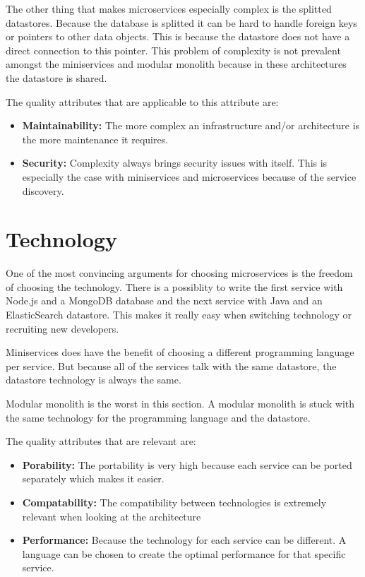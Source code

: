 The other thing that makes microservices especially complex is the splitted datastores. Because the database is splitted it can be hard to handle foreign keys or pointers to other data objects. This is because the datastore does not have a direct connection to this pointer. This problem of complexity is not prevalent amongst the miniservices and modular monolith because in these architectures the datastore is shared.

The quality attributes that are applicable to this attribute are:
\begin{itemize}
        \item \textbf{Maintainability:} The more complex an infrastructure and/or architecture is the more maintenance it requires.
        \item \textbf{Security:} Complexity always brings security issues with itself. This is especially the case with miniservices and microservices because of the service discovery.
\end{itemize}

\section{Technology}
\label{sec:Technology}

One of the most convincing arguments for choosing microservices is the freedom of choosing the technology. There is a possiblity to write the first service with Node.js and a MongoDB database and the next service with Java and an ElasticSearch datastore. This makes it really easy when switching technology or recruiting new developers.

Miniservices does have the benefit of choosing a different programming language per service. But because all of the services talk with the same datastore, the datastore technology is always the same.

Modular monolith is the worst in this section. A modular monolith is stuck with the same technology for the programming language and the datastore.

The quality attributes that are relevant are:
\begin{itemize}
        \item \textbf{Porability:} The portability is very high because each service can be ported separately which makes it easier.
        \item \textbf{Compatability:} The compatibility between technologies is extremely relevant when looking at the architecture
        \item \textbf{Performance:} Because the technology for each service can be different. A language can be chosen to create the optimal performance for that specific service.
\end{itemize}

